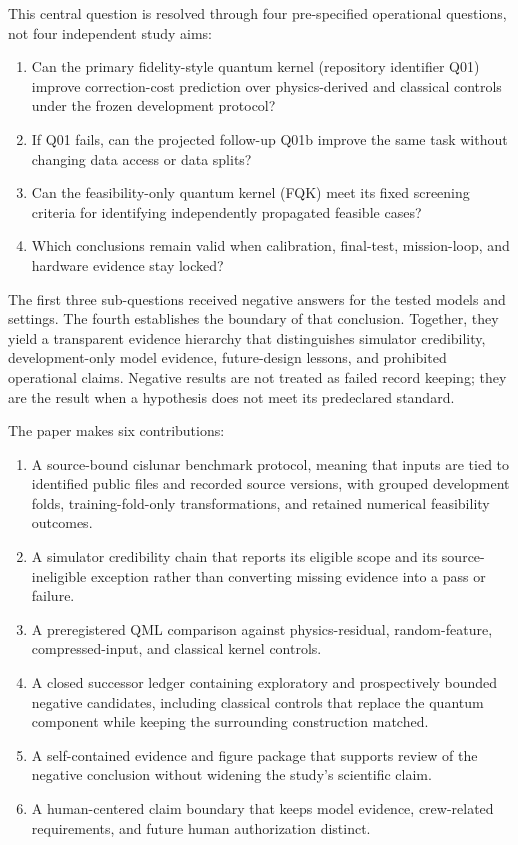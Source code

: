 This central question is resolved through four pre-specified operational
questions, not four independent study aims:
\begin{enumerate}
\item Can the primary fidelity-style quantum kernel (repository identifier
Q01) improve correction-cost prediction over physics-derived and classical
controls under the frozen development protocol?
\item If Q01 fails, can the projected follow-up Q01b improve the same task
without changing data access or data splits?
\item Can the feasibility-only quantum kernel (FQK) meet its fixed screening
criteria for identifying independently propagated feasible cases?
\item Which conclusions remain valid when calibration, final-test,
mission-loop, and hardware evidence stay locked?
\end{enumerate}

The first three sub-questions received negative answers for the tested models
and settings. The fourth establishes the boundary of that conclusion. Together,
they yield a transparent evidence hierarchy that distinguishes simulator
credibility, development-only model evidence, future-design lessons, and
prohibited operational claims. Negative results are not treated as failed
record keeping; they are the result when a hypothesis does not meet its
predeclared standard.

The paper makes six contributions:
\begin{enumerate}
\item A source-bound cislunar benchmark protocol, meaning that inputs are tied
to identified public files and recorded source versions, with grouped
development folds, training-fold-only transformations, and retained numerical
feasibility outcomes.
\item A simulator credibility chain that reports its eligible scope and its
source-ineligible exception rather than converting missing evidence into a
pass or failure.
\item A preregistered QML comparison against physics-residual, random-feature,
compressed-input, and classical kernel controls.
\item A closed successor ledger containing exploratory and prospectively
bounded negative candidates, including classical controls that replace the
quantum component while keeping the surrounding construction matched.
\item A self-contained evidence and figure package that supports review of the
negative conclusion without widening the study's scientific claim.
\item A human-centered claim boundary that keeps model evidence, crew-related
requirements, and future human authorization distinct.
\end{enumerate}
